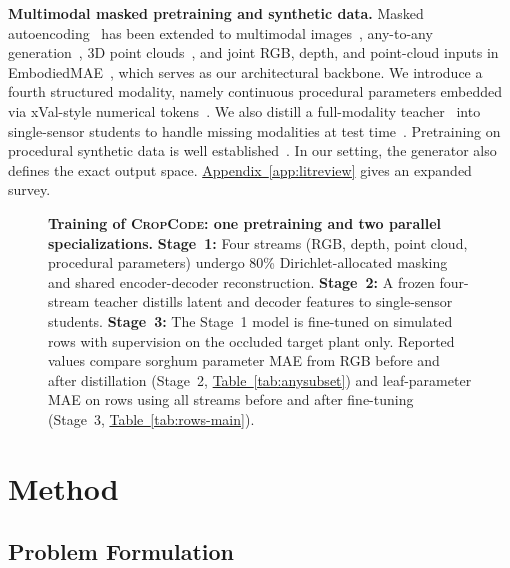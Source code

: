 \documentclass[10pt,twocolumn,letterpaper]{article}
\newcommand{\tabref}[1]{\hyperref[#1]{Table~\ref*{#1}}}
\newcommand{\appendixref}[1]{\hyperref[#1]{Appendix~\ref*{#1}}}
\newcommand{\method}{\textup{\textsc{CropCode}}}   %
\begin{document}
\noindent\textbf{Multimodal masked pretraining and synthetic data.}
Masked autoencoding~\citep{he2022mae} has been extended to multimodal images~\citep{bachmann2022multimae}, any-to-any generation~\citep{mizrahi2023fourm,bachmann2024fourm21}, 3D point clouds~\citep{pang2022pointmae}, and joint RGB, depth, and point-cloud inputs in EmbodiedMAE~\citep{dong2025embodiedmae}, which serves as our architectural backbone. We introduce a fourth structured modality, namely continuous procedural parameters embedded via xVal-style numerical tokens~\citep{golkar2023xval}. We also distill a full-modality teacher~\citep{hinton2015distillation} into single-sensor students to handle missing modalities at test time~\citep{wang2024robustmissing}. Pretraining on procedural synthetic data is well established~\citep{kataoka2020fractaldb,raistrick2023infinigen,greff2022kubric,tobin2017domainrand,fan2023intriguing}. In our setting, the generator also defines the exact output space. \appendixref{app:litreview} gives an expanded survey.



\begin{figure}[t]
  \centering
  \resizebox{\linewidth}{!}{}
    \caption{\textbf{Training of \method{}: one pretraining and two parallel specializations.}
    \textbf{Stage~1:} Four streams (RGB, depth, point cloud, procedural parameters) undergo 80\% Dirichlet-allocated masking and shared encoder-decoder reconstruction.
    \textbf{Stage~2:} A frozen four-stream teacher distills latent and decoder features to single-sensor students.
    \textbf{Stage~3:} The Stage~1 model is fine-tuned on simulated rows with supervision on the occluded target plant only.
    Reported values compare sorghum parameter MAE from RGB before and after distillation (Stage~2, \tabref{tab:anysubset}) and leaf-parameter MAE on rows using all streams before and after fine-tuning (Stage~3, \tabref{tab:rows-main}).}
  \label{fig:arch}
\end{figure}


\section{Method}
\label{sec:method}

\subsection{Problem Formulation}
\label{sec:method-form}
\end{document}
